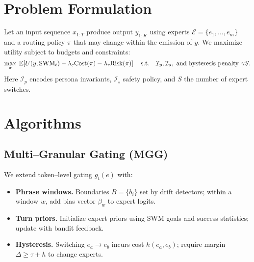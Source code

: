 \documentclass[11pt]{article}
\newcommand{\E}{\mathbb{E}}
\DeclareRobustCommand{\SWM}{\ifmmode\mathrm{SWM}\else\textsc{SWM}\fi}
\begin{document}
\section{Problem Formulation}
Let an input sequence $x_{1:T}$ produce output $y_{1:K}$ using experts $\mathcal{E}=\{e_1,\dots,e_m\}$ and a routing policy $\pi$ that may change within the emission of $y$.
We maximize utility subject to budgets and constraints:
\begin{equation}
\max_{\pi} \; \E\!\left[ U(y,\SWM_t) - \lambda_c \mathrm{Cost}(\pi) - \lambda_r \mathrm{Risk}(\pi) \right]
\quad \text{s.t.} \quad \mathcal{I}_p, \mathcal{I}_s, \ \text{and hysteresis penalty } \gamma S.
\end{equation}
Here $\mathcal{I}_p$ encodes persona invariants, $\mathcal{I}_s$ safety policy, and $S$ the number of expert switches.

\section{Algorithms}
\subsection{Multi--Granular Gating (MGG)}
We extend token--level gating $g_t(e)$ with:
\begin{itemize}[leftmargin=*,itemsep=2pt,topsep=2pt]
\item \textbf{Phrase windows.} Boundaries $B=\{b_i\}$ set by drift detectors; within a window $w$, add bias vector $\beta_w$ to expert logits.
\item \textbf{Turn priors.} Initialize expert priors using \SWM{} goals and success statistics; update with bandit feedback.
\item \textbf{Hysteresis.} Switching $e_a \to e_b$ incurs cost $h(e_a,e_b)$; require margin $\Delta \ge \tau + h$ to change experts.
\end{itemize}
\end{document}
